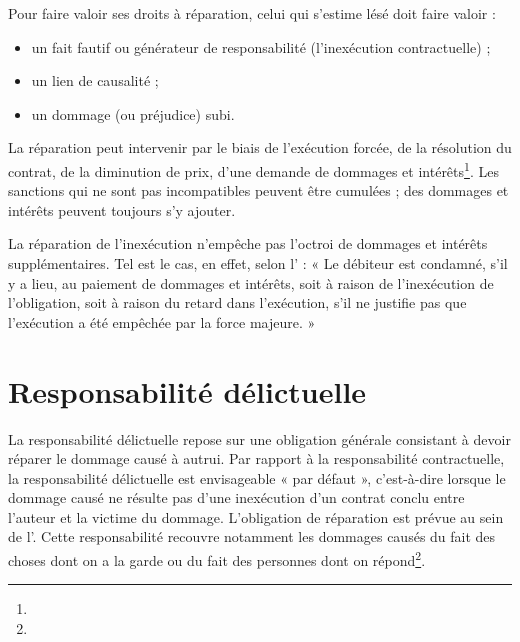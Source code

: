   Pour faire valoir ses droits à réparation, celui qui s'estime lésé doit faire valoir :
  \begin{itemize}
    \item un fait fautif ou générateur de responsabilité (l'inexécution contractuelle) ;
    \item un lien de causalité ;
    \item un dommage (ou préjudice) subi.
  \end{itemize}

  La réparation peut intervenir par le biais de l'exécution forcée, de la résolution du contrat, de la diminution de prix, d'une demande de dommages et intérêts\footnote{}. Les sanctions qui ne sont pas incompatibles peuvent être cumulées ; des dommages et intérêts peuvent toujours s'y ajouter.

  La réparation de l'inexécution n'empêche pas l'octroi de dommages et intérêts supplémentaires. Tel est le cas, en effet, selon l' : « Le débiteur est condamné, s'il y a lieu, au paiement de dommages et intérêts, soit à raison de l'inexécution de l'obligation, soit à raison du retard dans l'exécution, s'il ne justifie pas que l'exécution a été empêchée par la force majeure. »

\section{Responsabilité délictuelle}

  La responsabilité délictuelle repose sur une obligation générale consistant à devoir réparer le dommage causé à autrui. Par rapport à la responsabilité contractuelle, la responsabilité délictuelle est envisageable « par défaut », c'est-à-dire lorsque le dommage causé ne résulte pas d'une inexécution d'un contrat conclu entre l'auteur et la victime du dommage. L'obligation de réparation est prévue au sein de l'. Cette responsabilité recouvre notamment les dommages causés du fait des choses dont on a la garde ou du fait des personnes dont on répond\footnote{}.
